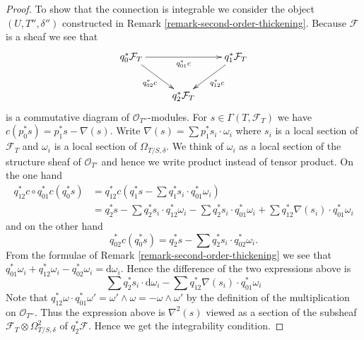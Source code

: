 \documentclass{amsart}
\theoremstyle{plain}
\theoremstyle{definition}
\theoremstyle{remark}
\numberwithin{equation}{subsection}
\begin{document}
\begin{proof}
\medskip\noindent
To show that the connection is integrable we consider the
object $(U, T'', \delta'')$ constructed in
Remark \ref{remark-second-order-thickening}.
Because $\mathcal{F}$ is a sheaf we see that
$$
\xymatrix{
q_0^*\mathcal{F}_T \ar[rr]_{q_{01}^*c} \ar[rd]_{q_{02}^*c} & &
q_1^*\mathcal{F}_T \ar[ld]^{q_{12}^*c} \\
& q_2^*\mathcal{F}_T
}
$$
is a commutative diagram of $\mathcal{O}_{T''}$-modules. For
$s \in \Gamma(T, \mathcal{F}_T)$ we have
$c(p_0^*s) = p_1^*s - \nabla(s)$. Write
$\nabla(s) = \sum p_1^*s_i \cdot \omega_i$ where $s_i$ is a local section
of $\mathcal{F}_T$ and $\omega_i$ is a local section of $\Omega_{T/S, \delta}$.
We think of $\omega_i$ as a local section of the structure
sheaf of $\mathcal{O}_{T'}$ and hence we write product instead of tensor
product. On the one hand
\begin{align*}
q_{12}^*c \circ q_{01}^*c(q_0^*s) & = 
q_{12}^*c(q_1^*s - \sum q_1^*s_i \cdot q_{01}^*\omega_i) \\
& =
q_2^*s - \sum q_2^*s_i \cdot q_{12}^*\omega_i -
\sum q_2^*s_i \cdot q_{01}^*\omega_i +
\sum q_{12}^*\nabla(s_i) \cdot q_{01}^*\omega_i
\end{align*}
and on the other hand
$$
q_{02}^*c(q_0^*s) = q_2^*s - \sum q_2^*s_i \cdot q_{02}^*\omega_i.
$$
From the formulae of Remark \ref{remark-second-order-thickening} we see
that
$q_{01}^*\omega_i + q_{12}^*\omega_i - q_{02}^*\omega_i = \text{d}\omega_i$.
Hence the difference of the two expressions above is
$$
\sum q_2^*s_i \cdot \text{d}\omega_i -
\sum q_{12}^*\nabla(s_i) \cdot q_{01}^*\omega_i
$$
Note that
$q_{12}^*\omega \cdot q_{01}^*\omega' = \omega' \wedge \omega =
- \omega \wedge \omega'$ by the definition of the multiplication on
$\mathcal{O}_{T''}$. Thus the expression above is $\nabla^2(s)$ viewed
as a section of the subsheaf $\mathcal{F}_T \otimes \Omega^2_{T/S, \delta}$ of
$q_2^*\mathcal{F}$. Hence we get the integrability condition.
\end{proof}
\end{document}
